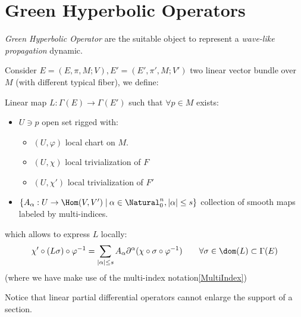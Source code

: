 \documentclass[Main]{subfiles}
\begin{document}
		\section{Green Hyperbolic Operators}
					\emph{Green Hyperbolic Operator} are the suitable object to represent a \emph{wave-like propagation} dynamic.
					
		Consider $E=(E,\pi,M;V), E'=(E',\pi',M;V')$ two linear vector bundle over $M$ (with different typical fiber), we define:
		\begin{definition}\label{Def:LPDO}
			Linear map $L:\Gamma(E)\rightarrow \Gamma(E')$ such that $\forall p \in M$ exists:
		\begin{itemize}
			\item $U \ni p$ open set rigged with:
				\begin{itemize}
					\item $(U, \varphi )$ local chart on $M$.
					\item $(U, \chi)$ local trivialization of $F$
					\item $(U, \chi')$ local trivialization of $F'$
				\end{itemize}
			\item $\{A_\alpha :U \rightarrow \Hom(V,V')\; \vert \: \alpha \in \Natural_0^n, \vert \alpha \vert \leq s \}$ collection of smooth maps labeled by multi-indices.
		\end{itemize}
		which allows to express $L$ locally:
		\begin{displaymath}
			\chi' \circ ( L \sigma) \circ \varphi^{-1} =
			\sum_{\vert \alpha \vert \leq s} A_\alpha \partial^\alpha (\chi \circ \sigma \circ \varphi^{-1} ) 
			\qquad \forall \sigma \in \dom(L) \subset \Gamma(E)
		\end{displaymath}
		(where we have make use of the multi-index notation\ref{MultiIndex})
	\end{definition}
		\begin{observation}
			Notice that linear partial differential operators cannot enlarge the support of a section.
		\end{observation}
		
\end{document}
